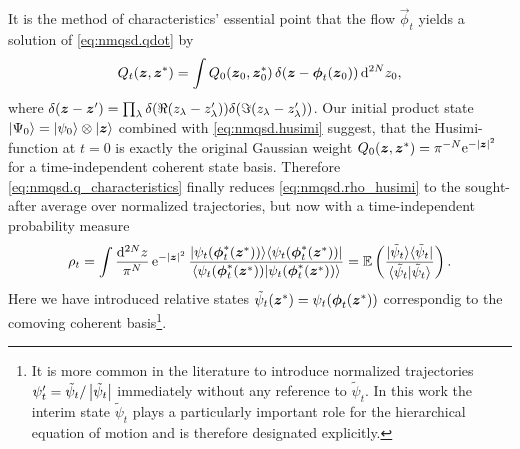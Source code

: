 It is the method of characteristics' essential point that the flow $\vec\phi_t$ yields a solution of \autoref{eq:nmqsd.qdot} by
\begin{equation}
  Q_t(\boldsymbol{z}, {\boldsymbol{z}}^*) = \int Q_0(\boldsymbol{z}_0, {\boldsymbol{z}}^*_0) \, \delta(\boldsymbol{z} - \boldsymbol{\phi}_t(\boldsymbol{z}_0)) \, \mathrm{d}^{2N} z_0,
  \label{eq:nmqsd.q_characteristics}
\end{equation}
where $\delta(\boldsymbol{z} - \boldsymbol{z}') = \prod_\lambda \delta(\Re(z_\lambda - z_\lambda')) \delta(\Im(z_\lambda - z_\lambda'))$.
Our initial product state $| \Psi_0 \rangle = | \psi_0 \rangle \otimes | \boldsymbol{z} \rangle$ combined with \autoref{eq:nmqsd.husimi} suggest, that the Husimi-function at $t=0$ is exactly the original Gaussian weight $Q_0(\zz, \cc\zz) = \pi^{-N} \exp[-\abs{\zz}^2]$ for a time-independent coherent state basis.
Therefore \autoref{eq:nmqsd.q_characteristics} finally reduces \autoref{eq:nmqsd.rho_husimi} to the sought-after average over normalized trajectories, but now with a time-independent probability measure
\begin{equation}
  \rho_t = \int \frac{\mathrm{d}^{2N}z}{\pi^N} \, \exp[-\abs{\zz}^2] \, \frac{\ket\psitphi \bra\psitphi}{\braket{\psitphi}{\psitphi}}
         = \E[ \frac{\ket{\tilde\psi_t}\bra{\tilde\psi_t}}{\braket{\tilde\psi_t}{\tilde\psi_t}}].
  \label{eq:nmqsd.reduced_matrix_comoving}
\end{equation}
Here we have introduced relative states $\tilde\psi_t({\boldsymbol{z}}^*) = \psi_t(\boldsymbol{\phi}_t({\boldsymbol{z}}^*))$ correspondig to the comoving coherent basis\footnote{%
  It is more common in the literature to introduce normalized trajectories $\psi'_t = \tilde\psi_t / \left\vert \tilde\psi_t \right\vert$ immediately without any reference to $\tilde\psi_t$.
  In this work the interim state $\tilde\psi_t$ plays a particularly important role for the hierarchical equation of motion and is therefore designated explicitly.
}.\\



